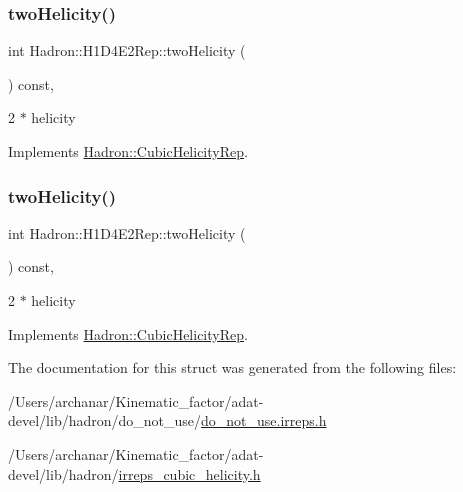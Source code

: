 \subsubsection{\texorpdfstring{twoHelicity()}{twoHelicity()}\hspace{0.1cm}{\footnotesize\ttfamily [2/3]}}
{\footnotesize\ttfamily int Hadron\+::\+H1\+D4\+E2\+Rep\+::two\+Helicity (\begin{DoxyParamCaption}{ }\end{DoxyParamCaption}) const\hspace{0.3cm}{\ttfamily [inline]}, {\ttfamily [virtual]}}

2 $\ast$ helicity 

Implements \mbox{\hyperlink{structHadron_1_1CubicHelicityRep_af507aa56fc2747eacc8cb6c96db31ecc}{Hadron\+::\+Cubic\+Helicity\+Rep}}.

\mbox{\label{structHadron_1_1H1D4E2Rep_a47b668915545d363a373bd37f3bfb75f}} 
\subsubsection{\texorpdfstring{twoHelicity()}{twoHelicity()}\hspace{0.1cm}{\footnotesize\ttfamily [3/3]}}
{\footnotesize\ttfamily int Hadron\+::\+H1\+D4\+E2\+Rep\+::two\+Helicity (\begin{DoxyParamCaption}{ }\end{DoxyParamCaption}) const\hspace{0.3cm}{\ttfamily [inline]}, {\ttfamily [virtual]}}

2 $\ast$ helicity 

Implements \mbox{\hyperlink{structHadron_1_1CubicHelicityRep_af507aa56fc2747eacc8cb6c96db31ecc}{Hadron\+::\+Cubic\+Helicity\+Rep}}.



The documentation for this struct was generated from the following files\+:\begin{DoxyCompactItemize}
\item 
/\+Users/archanar/\+Kinematic\+\_\+factor/adat-\/devel/lib/hadron/do\+\_\+not\+\_\+use/\mbox{\hyperlink{adat-devel_2lib_2hadron_2do__not__use_2do__not__use_8irreps_8h}{do\+\_\+not\+\_\+use.\+irreps.\+h}}\item 
/\+Users/archanar/\+Kinematic\+\_\+factor/adat-\/devel/lib/hadron/\mbox{\hyperlink{adat-devel_2lib_2hadron_2irreps__cubic__helicity_8h}{irreps\+\_\+cubic\+\_\+helicity.\+h}}\end{DoxyCompactItemize}
